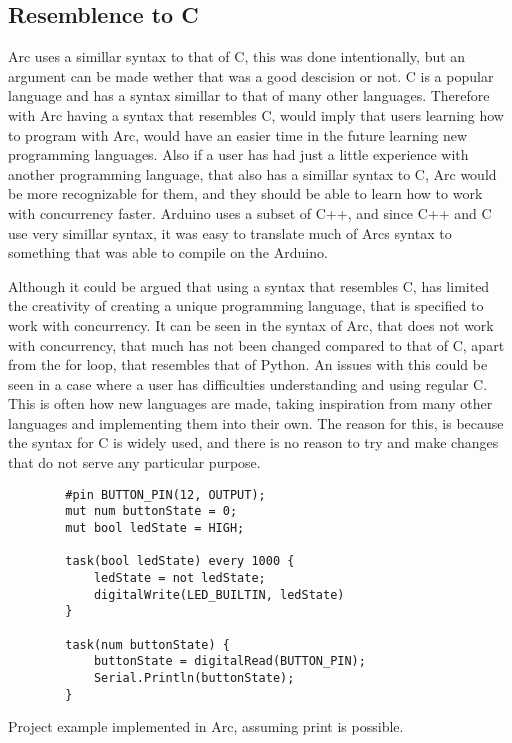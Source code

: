 \subsection{Resemblence to C}
Arc uses a simillar syntax to that of C, this was done intentionally, but an argument can be made wether that was a good descision or not. C is a popular language and has a syntax simillar to that of many other languages. Therefore with Arc having a syntax that resembles C, would imply that users learning how to program with Arc, would have an easier time in the future learning new programming languages. Also if a user has had just a little experience with another programming language, that also has a simillar syntax to C, Arc would be more recognizable for them, and they should be able to learn how to work with concurrency faster. Arduino uses a subset of C++, and since C++ and C use very simillar syntax, it was easy to translate much of Arcs syntax to something that was able to compile on the Arduino.

Although it could be argued that using a syntax that resembles C, has limited the creativity of creating a unique programming language, that is specified to work with concurrency. It can be seen in the syntax of Arc, that does not work with concurrency, that much has not been changed compared to that of C, apart from the for loop, that resembles that of Python. An issues with this could be seen in a case where a user has difficulties understanding and using regular C. This is often how new languages are made, taking inspiration from many other languages and implementing them into their own. The reason for this, is because the syntax for C is widely used, and there is no reason to try and make changes that do not serve any particular purpose. 


\begin{listing}[htb!]
    \begin{verbatim}
        #pin BUTTON_PIN(12, OUTPUT);
        mut num buttonState = 0;
        mut bool ledState = HIGH;

        task(bool ledState) every 1000 {
            ledState = not ledState;
            digitalWrite(LED_BUILTIN, ledState)
        }

        task(num buttonState) {
            buttonState = digitalRead(BUTTON_PIN);
            Serial.Println(buttonState);
        }
    \end{verbatim}
    \caption{Project example implemented in Arc, assuming print is possible.}
    \label{lst:arcexample}
\end{listing}